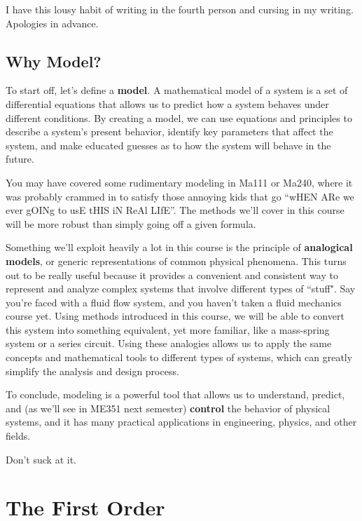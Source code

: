 \documentclass{report}
\begin{document}
\begin{onehalfspacing}
\begin{flushleft}
\medskip

I have this lousy habit of writing in the fourth person and cursing in my writing. Apologies in advance.

\section{Why Model?}

To start off, let's define a \textbf{model}. A mathematical model of a system is a set of differential equations that allows us to predict how a system behaves under different conditions. By creating a model, we can use equations and principles to describe a system's present behavior, identify key parameters that affect the system, and make educated guesses as to how the system will behave in the future.

\medskip

You may have covered some rudimentary modeling in Ma111 or Ma240, where it was probably crammed in to satisfy those annoying kids that go ``wHEN ARe we ever gOINg to usE tHIS iN ReAl LIfE''. The methods we'll cover in this course will be more robust than simply going off a given formula.

\medskip

Something we'll exploit heavily a lot in this course is the principle of \textbf{analogical models}, or generic representations of common physical phenomena. This turns out to be really useful because it provides a convenient and consistent way to represent and analyze complex systems that involve different types of ``stuff". Say you're faced with a fluid flow system, and you haven't taken a fluid mechanics course yet. Using methods introduced in this course, we will be able to convert this system into something equivalent, yet more familiar, like a mass-spring system or a series circuit. Using these analogies allows us to apply the same concepts and mathematical tools to different types of systems, which can greatly simplify the analysis and design process.

\medskip

To conclude, modeling is a powerful tool that allows us to understand, predict, and (as we'll see in ME351 next semester) \textbf{control} the behavior of physical systems, and it has many practical applications in engineering, physics, and other fields.

\medskip

Don't suck at it.

\chapter{The First Order}


\end{flushleft}
\end{onehalfspacing}
\end{document}
